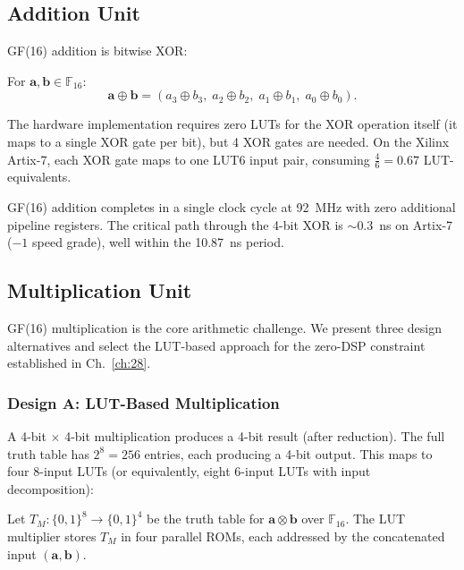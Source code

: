 \subsection{Addition Unit}

GF(16) addition is bitwise XOR:

\begin{definition}[GF(16) addition]
\label{def:hwbridge:gf16-add}
For $\mathbf{a}, \mathbf{b} \in \mathbb{F}_{16}$:
\[
  \mathbf{a} \oplus \mathbf{b} = (a_3 \oplus b_3,\; a_2 \oplus b_2,\; a_1 \oplus b_1,\; a_0 \oplus b_0).
\]
\end{definition}

The hardware implementation requires zero LUTs for the XOR operation itself
(it maps to a single XOR gate per bit), but 4 XOR gates are needed. On the
Xilinx Artix-7, each XOR gate maps to one LUT6 input pair, consuming
$\tfrac{4}{6} = 0.67$ LUT-equivalents.

\begin{proposition}
\label{prop:hwbridge:add-latency}
GF(16) addition completes in a single clock cycle at 92~MHz with zero
additional pipeline registers. The critical path through the 4-bit XOR is
$\sim 0.3$~ns on Artix-7 ($-1$ speed grade), well within the 10.87~ns period.
\end{proposition}

\subsection{Multiplication Unit}

GF(16) multiplication is the core arithmetic challenge. We present three
design alternatives and select the LUT-based approach for the zero-DSP
constraint established in Ch.~\ref{ch:28}.

\subsubsection{Design A: LUT-Based Multiplication}

A 4-bit $\times$ 4-bit multiplication produces a 4-bit result (after reduction).
The full truth table has $2^8 = 256$ entries, each producing a 4-bit output.
This maps to four 8-input LUTs (or equivalently, eight 6-input LUTs with
input decomposition):

\begin{definition}
\label{def:hwbridge:gf16-mul-lut}
Let $T_M\colon \{0,1\}^8 \to \{0,1\}^4$ be the truth table for
$\mathbf{a} \otimes \mathbf{b}$ over $\mathbb{F}_{16}$. The LUT multiplier
stores $T_M$ in four parallel ROMs, each addressed by the concatenated input
$(\mathbf{a}, \mathbf{b})$.
\end{definition}


